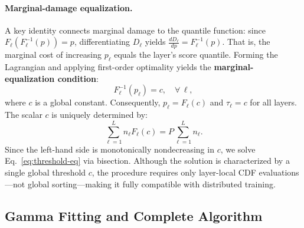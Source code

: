 ﻿\documentclass[11pt]{article}
\begin{document}
\paragraph{Marginal-damage equalization.}
A key identity connects marginal damage to the quantile function: since $F_\ell(F_\ell^{-1}(p))=p$, differentiating $D_\ell$ yields $\frac{dD_\ell}{dp}=F_\ell^{-1}(p)$. That is, the marginal cost of increasing $p_\ell$ equals the layer's score quantile. Forming the Lagrangian and applying first-order optimality yields the \textbf{marginal-equalization condition}:
\begin{equation}
F_\ell^{-1}(p_\ell) = c, \quad \forall\,\ell,
\end{equation}
where $c$ is a global constant. Consequently, $p_\ell = F_\ell(c)$ and $\tau_\ell = c$ for all layers. The scalar $c$ is uniquely determined by:
\begin{equation}
\sum_{\ell=1}^L n_\ell F_\ell(c)
=
P\sum_{\ell=1}^L n_\ell.
\label{eq:threshold-eq}
\end{equation}
Since the left-hand side is monotonically nondecreasing in $c$, we solve Eq.~\eqref{eq:threshold-eq} via bisection. Although the solution is characterized by a single global threshold $c$, the procedure requires only layer-local CDF evaluations---not global sorting---making it fully compatible with distributed training.

\subsection{Gamma Fitting and Complete Algorithm}
\end{document}
